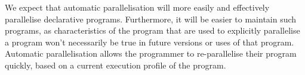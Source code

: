 

We expect that automatic parallelisation will more easily and
effectively parallelise declarative programs.
Furthermore, it will be easier to maintain such programs, as
characteristics of the program that are used to explicitly parallelise
a program won't necessarily be true in future versions or uses of that
program.
Automatic parallelisation allows the programmer to re-parallelise
their program quickly, based on a current execution profile of the
program.

